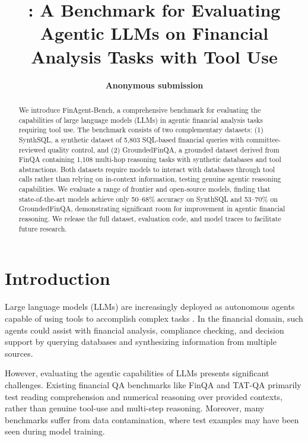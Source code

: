\documentclass[11pt]{article}
\title{\datasetname: A Benchmark for Evaluating Agentic LLMs on Financial Analysis Tasks with Tool Use}
\author{
  \textbf{Anonymous submission}
}
\newcommand{\datasetname}{FinAgent-Bench\xspace}
\newcommand{\synthsubset}{SynthSQL\xspace}
\newcommand{\groundedfinqa}{GroundedFinQA\xspace}
\begin{document}
\maketitle

\begin{abstract}
We introduce \datasetname, a comprehensive benchmark for evaluating the capabilities of large language models (LLMs)
in agentic financial analysis tasks requiring tool use. The benchmark consists of two complementary datasets: (1) \synthsubset,
a synthetic dataset of 5,803 SQL-based financial queries with committee-reviewed quality control, and (2) \groundedfinqa,
a grounded dataset derived from FinQA containing 1,108 multi-hop reasoning tasks with synthetic databases and tool abstractions.
Both datasets require models to interact with databases through tool calls rather than relying on in-context information,
testing genuine agentic reasoning capabilities. We evaluate a range of frontier and open-source models, finding that state-of-the-art
models achieve only 50--68\% accuracy on \synthsubset and 53--70\% on \groundedfinqa, demonstrating significant room for improvement
in agentic financial reasoning. We release the full dataset, evaluation code, and model traces to facilitate future research.
\end{abstract}

\section{Introduction}

Large language models (LLMs) are increasingly deployed as autonomous agents capable of using tools to accomplish complex tasks
\citep{Schick2023ToolformerLM, qin2023toolllm}. In the financial domain, such agents could assist with financial analysis, compliance
checking, and decision support by querying databases and synthesizing information from multiple sources.

However, evaluating the agentic capabilities of LLMs presents significant challenges. Existing financial QA benchmarks like FinQA
\citep{chen2021finqa} and TAT-QA \citep{zhu-etal-2021-tat} primarily test reading comprehension and numerical reasoning over provided
contexts, rather than genuine tool-use and multi-step reasoning. Moreover, many benchmarks suffer from data contamination, where test
examples may have been seen during model training.
\end{document}
